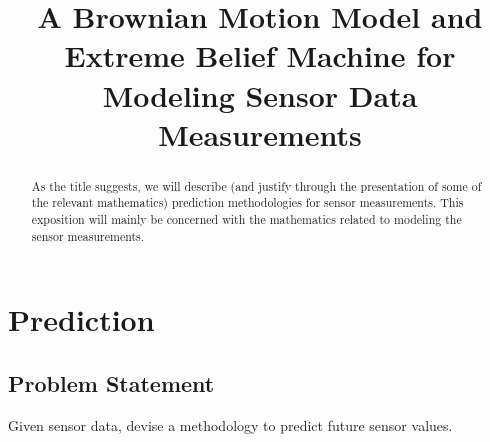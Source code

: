 \documentclass[11pt]{imsart}
\begin{document}
\begin{frontmatter}

\title{A Brownian Motion Model and Extreme Belief Machine for Modeling Sensor Data Measurements}

\author{ }
\address{}


\begin{abstract}
As the title suggests, we will describe (and justify through the presentation of some of the relevant mathematics) prediction methodologies for sensor measurements.  This exposition will mainly be concerned with the mathematics related to modeling the sensor measurements.
\end{abstract}


\begin{keyword}
\end{keyword}

\end{frontmatter}

\newpage

\tableofcontents

\newpage


\section{Prediction}
\label{prediction}

\subsection{Problem Statement}
\label{pproblem}

Given sensor data, devise a methodology to predict future sensor values.
\end{document}
